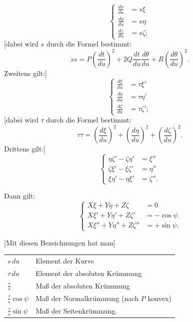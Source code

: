 %
\begin{equation}\tag*{[4]}
\left\{\begin{aligned}
\frac{dx}{du}&=s\xi\\
\frac{dy}{du}&=s\eta\\
\frac{dz}{du}&=s\zeta;
\end{aligned}\right.
\end{equation}
[dabei wird $s$ durch die Formel bestimmt:
\begin{equation}\tag*{[5]}
ss=P\left(\frac{dt}{du}\right)^2+2Q\frac{dt}{du}\frac{d\theta}{du}+R\left(\frac{d\theta}{du}\right)^2.
\end{equation}
Zweitens gilt:]
\begin{equation}\tag*{[6]}
\left\{\begin{aligned}
\frac{d\xi}{du}&=\tau\xi'\\
\frac{d\eta}{du}&=\tau\eta'\\
\frac{d\zeta}{du}&=\tau\zeta';
\end{aligned}\right.
\end{equation}
[dabei wird $\tau$ durch die Formel bestimmt:
\begin{equation}\tag*{[7]}
\tau\tau=\left(\frac{d\xi}{du}\right)^2+\left(\frac{d\eta}{du}\right)^2+\left(\frac{d\zeta}{du}\right)^2.
\end{equation}
Drittens gilt:]
\begin{equation}\tag*{[8]}
\left\{\begin{aligned}
\eta\zeta'-\zeta\eta'&=\xi''\\
\zeta\xi'-\xi\zeta'&=\eta''\\
\xi\eta'-\eta\xi'&=\zeta''.
\end{aligned}\right.
\end{equation}
\par Dann gilt:
\begin{equation}\tag*{[9]}
\left\{\begin{aligned}
X\xi+Y\eta+Z\zeta&=0\\
X\xi'+Y\eta'+Z\zeta'&=-\cos\psi\\
X\xi''+Y\eta''+Z\zeta''&=+\sin\psi.
\end{aligned}\right.
\end{equation}

[Mit diesen Bezeichnungen hat man]
\begin{center}
\begin{tabular}{ll}
$s\,du$&Element der Kurve\\[3pt]
$\tau\,du$&Element der absoluten Krümmung\\[3pt]
$\frac{\tau}{s}$&Maß der absoluten Krümmung\\[3pt]
$\frac{\tau}{s}\cos\psi$&Maß der Normalkrümmung (nach $P$ konvex)\\[3pt]
$\frac{\tau}{s}\sin\psi$&Maß der Seitenkrümmung.
\end{tabular}
\par\medskip

\end{center}
